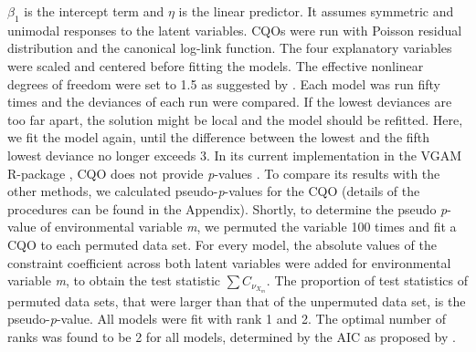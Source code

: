 \documentclass[a4paper,11pt]{article}
\begin{document}
		$\beta_1$ is the intercept term and $\eta$ is the linear predictor. 
        It assumes symmetric and unimodal responses to the latent variables.
		CQOs were run with Poisson residual distribution and the canonical log-link function.
		The four explanatory variables were scaled and centered before fitting the models.
		The effective nonlinear degrees of freedom were set to 1.5 as suggested by \citet{yee2015vector}.
		Each model was run fifty times and the deviances of each run were compared. 
		If the lowest deviances are too far apart, the solution might be local and the model should be refitted.  
		Here, we fit the model again, until the difference between the lowest and the fifth lowest deviance no longer exceeds 3. 
        In its current implementation in the VGAM R-package \citep{VGAM19}, CQO does not provide \textit{p}-values \citep[but see][]{yee2010vglms}. 
        To compare its results with the other methods, we calculated pseudo-\textit{p}-values for the CQO (details of the procedures can be found in the 
        Appendix).
        Shortly, to determine the pseudo \textit{p}-value of environmental variable \textit{m}, we permuted the variable 100 times and fit a CQO to each permuted data set. 
        For every model, the absolute values of the constraint coefficient across both latent variables were added for environmental variable \textit{m}, to obtain the test statistic $\sum C_{\nu_{X_{m}}}$. 
        The proportion of test statistics of permuted data sets, that were larger than that of the unpermuted data set, is the pseudo-\textit{p}-value. 
	    All models were fit with rank 1 and 2.
		The optimal number of ranks was found to be 2 for all models, determined by the AIC as proposed by \citet{yee2003reduced}.\\

\end{document}
